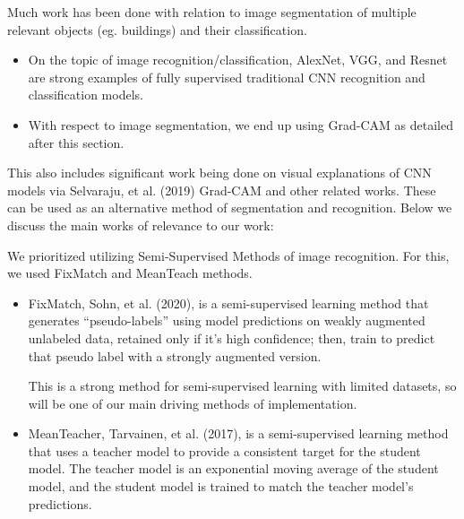 \documentclass{article}
\begin{document}
Much work has been done with relation to image segmentation of multiple relevant objects (eg. buildings) and their classification.

\begin{itemize}
    \item On the topic of image recognition/classification, AlexNet, VGG, and Resnet\cite{krizhevsky}\cite{simonyan}\cite{he} are strong examples of fully supervised traditional CNN recognition and classification models. 
    \item With respect to image segmentation, we end up using Grad-CAM as detailed after this section.
\end{itemize}

This also includes significant work being done on visual explanations of CNN models via Selvaraju, et al.\cite{selvaraju} (2019) Grad-CAM and other related works. These can be used as an alternative method of segmentation and recognition. Below we discuss the main works of relevance to our work:

We prioritized utilizing Semi-Supervised Methods of image recognition. For this, we used FixMatch and MeanTeach methods. 

\begin{itemize}
    \item FixMatch, Sohn, et al.\cite{sohn} (2020), is a semi-supervised learning method that generates “pseudo-labels” using model predictions on weakly augmented unlabeled data, retained only if it’s high confidence; then, train to predict that pseudo label with a strongly augmented version.

    This is a strong method for semi-supervised learning with limited datasets, so will be one of our main driving methods of implementation.
    \item MeanTeacher, Tarvainen, et al.\cite{tarvainen} (2017), is a semi-supervised learning method that uses a teacher model to provide a consistent target for the student model. The teacher model is an exponential moving average of the student model, and the student model is trained to match the teacher model’s predictions.
\end{itemize}

\end{document}
